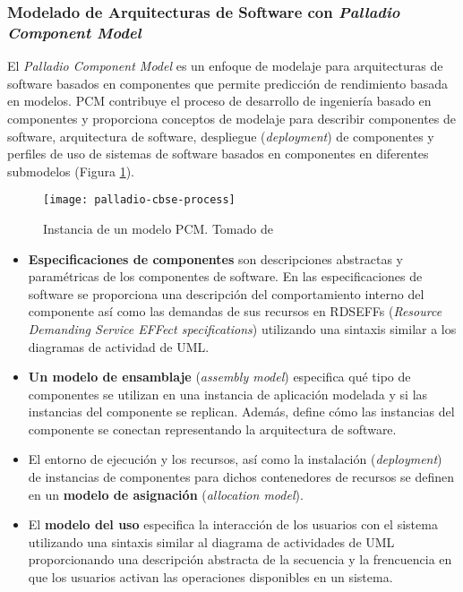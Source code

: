 \subsubsection{Modelado de Arquitecturas de Software con \emph{Palladio Component Model}} \label{sec:pcm}
El \emph{Palladio Component Model} es un enfoque de modelaje para arquitecturas de software basados en componentes que permite predicción de rendimiento basada en modelos. PCM contribuye el proceso de desarrollo de ingeniería basado en componentes y proporciona conceptos de modelaje para describir componentes de software, arquitectura de software, despliegue (\emph{deployment}) de componentes y perfiles de uso de sistemas de software basados en componentes en diferentes submodelos (Figura \ref{fig:pcm-instance}). 

\begin{figure}[h]
  \centering
  \texttt{[image: palladio-cbse-process]}
  \caption[Instancia de un modelo PCM]{Instancia de un modelo PCM. Tomado de \protect\cite{Becker:2009:PCM:1458724.1458819}}
  \label{fig:pcm-instance}
\end{figure}

\begin{itemize}
    \item \textbf{Especificaciones de componentes} son descripciones abstractas y paramétricas de los componentes de software. En las especificaciones de software se proporciona una descripción del comportamiento interno del componente así como las demandas de sus recursos en RDSEFFs (\emph{Resource Demanding Service EFFect specifications}) utilizando una sintaxis similar a los diagramas de actividad de UML.
    \item \textbf{Un modelo de ensamblaje} (\emph{assembly model}) especifica qué tipo de componentes se utilizan en una instancia de aplicación modelada y si las instancias del componente se replican. Además, define cómo las instancias del componente se conectan representando la arquitectura de software.
    \item El entorno de ejecución y los recursos, así como la instalación (\emph{deployment}) de instancias de componentes para dichos contenedores de recursos se definen en un \textbf{modelo de asignación} (\emph{allocation model}).
    \item El \textbf{modelo del uso} especifica la interacción de los usuarios con el sistema utilizando una sintaxis similar al diagrama de actividades de UML proporcionando una descripción abstracta de la secuencia y la frencuencia en que los usuarios activan las operaciones disponibles en un sistema.
\end{itemize}

